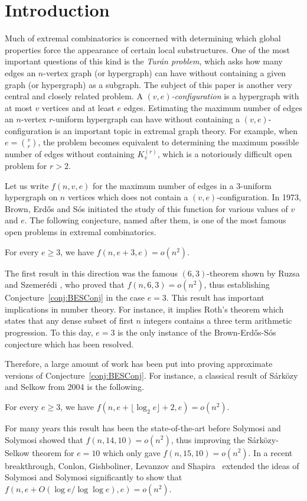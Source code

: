 \section{Introduction}

Much of extremal combinatorics is concerned with determining which global properties force the appearance of certain local substructures. One of the most important questions of this kind is the \emph{Tur\'an problem}, which asks how many edges an $n$-vertex graph (or hypergraph) can have without containing a given graph (or hypergraph) as a subgraph. The subject of this paper is another very central and closely related problem. A \emph{$(v,e)$-configuration} is a hypergraph with at most $v$ vertices and at least $e$ edges. Estimating the maximum number of edges an $n$-vertex $r$-uniform hypergraph can have without containing a $(v,e)$-configuration is an important topic in extremal graph theory. For example, when $e=\binom{v}{r}$, the problem becomes equivalent to determining the maximum possible number of edges without containing $K_v^{(r)}$, which is a notoriously difficult open problem for $r>2$.

Let us write $f(n, v, e)$ for the maximum number of edges in a $3$-uniform hypergraph on $n$ vertices which does not contain a $(v, e)$-configuration. In 1973, Brown, Erd\H os and S\' os \cite{BES73,BES73_2} initiated the study of this function for various values of $v$ and $e$. The following conjecture, named after them, is one of the most famous open problems in extremal combinatorics.

\begin{conjecture} \label{conj:BESConj}
    For every $e\geq 3$, we have $f(n,e+3,e)=o(n^2)$.
\end{conjecture}

The first result in this direction was the famous $(6, 3)$-theorem shown by Ruzsa and Szemer\'edi \cite{RS76}, who proved that $f(n, 6, 3)=o(n^2)$, thus establishing Conjecture~\ref{conj:BESConj} in the case $e=3$. 
This result has important implications in number theory. For instance, it implies Roth's theorem which states that any dense subset of first $n$ integers contains a three term arithmetic progression.
To this day, $e=3$ is the only instance of the Brown-Erd\H{o}s-S\'os conjecture which has been resolved. 

Therefore, a large amount of work has been put into proving approximate versions of Conjecture~\ref{conj:BESConj}. For instance, a classical result of S\'ark\"ozy and Selkow \cite{SS04} from 2004 is the following.
\begin{theorem}
For every $e \ge 3$, we have  $f(n, e+\lfloor \log_2 e\rfloor +2, e)=o(n^2)$.
\end{theorem}
For many years this result has been the state-of-the-art before Solymosi and Solymosi \cite{SS17} showed that $f(n, 14, 10)=o(n^2)$, thus improving the S\'ark\"ozy-Selkow theorem for $e=10$ which only gave $f(n, 15, 10)=o(n^2)$. In a recent breakthrough, Conlon, Gishboliner, Levanzov and Shapira~\cite{CGLS23} extended the ideas of Solymosi and Solymosi significantly to show that $f(n, e+O(\log e/\log\log e), e)=o(n^2)$. 

